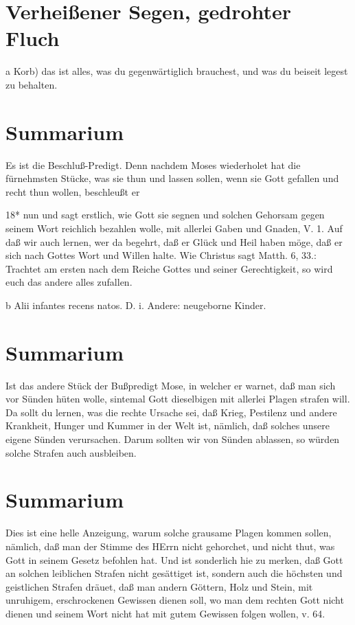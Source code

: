 \section{Verheißener Segen, gedrohter Fluch}

a Korb) das ist alles, was du gegenwärtiglich brauchest, und was du beiseit legest zu behalten.

\section{Summarium}

Es ist die Beschluß-Predigt. Denn nachdem Moses wiederholet hat die fürnehmsten Stücke, was sie thun und lassen sollen, wenn sie Gott gefallen und recht thun wollen, beschleußt er

18*
nun und sagt erstlich, wie Gott sie segnen und solchen Gehorsam gegen seinem Wort reichlich bezahlen wolle, mit allerlei Gaben und Gnaden, V. 1. Auf daß wir auch lernen, wer da begehrt, daß er Glück und Heil haben möge, daß er sich nach Gottes Wort und Willen halte. Wie Christus sagt Matth. 6, 33.: Trachtet am ersten nach dem Reiche Gottes und seiner Gerechtigkeit, so wird euch das andere alles zufallen.

b Alii infantes recens natos. D. i. Andere: neugeborne Kinder.

\section{Summarium}

Ist das andere Stück der Bußpredigt Mose, in welcher er warnet, daß man sich vor Sünden hüten wolle, sintemal Gott dieselbigen mit allerlei Plagen strafen will. Da sollt du lernen, was die rechte Ursache sei, daß Krieg, Pestilenz und andere Krankheit, Hunger und Kummer in der Welt ist, nämlich, daß solches unsere eigene Sünden verursachen. Darum sollten wir von Sünden ablassen, so würden solche Strafen auch ausbleiben.

\section{Summarium}

Dies ist eine helle Anzeigung, warum solche grausame Plagen kommen sollen, nämlich, daß man der Stimme des HErrn nicht gehorchet, und nicht thut, was Gott in seinem Gesetz befohlen hat. Und ist sonderlich hie zu merken, daß Gott an solchen leiblichen Strafen nicht gesättiget ist, sondern auch die höchsten und geistlichen Strafen dräuet, daß man andern Göttern, Holz und Stein, mit unruhigem, erschrockenen Gewissen dienen soll, wo man dem rechten Gott nicht dienen und seinem Wort nicht hat mit gutem Gewissen folgen wollen, v. 64.

